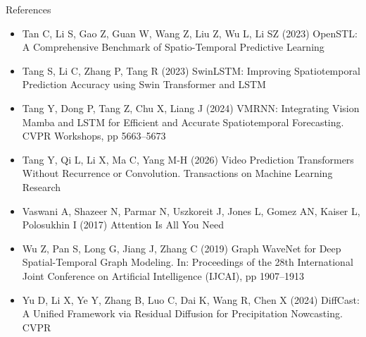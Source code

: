 \documentclass{beamer}
\begin{document}
\begin{frame}[allowframebreaks]{References}
\begin{itemize}
        \item[] Tan C, Li S, Gao Z, Guan W, Wang Z, Liu Z, Wu L, Li SZ (2023) OpenSTL: A Comprehensive Benchmark of Spatio-Temporal Predictive Learning
        \item[] Tang S, Li C, Zhang P, Tang R (2023) SwinLSTM: Improving Spatiotemporal Prediction Accuracy using Swin Transformer and LSTM
        \item[] Tang Y, Dong P, Tang Z, Chu X, Liang J (2024) VMRNN: Integrating Vision Mamba and LSTM for Efficient and Accurate Spatiotemporal Forecasting. CVPR Workshops, pp 5663--5673
        \item[] Tang Y, Qi L, Li X, Ma C, Yang M-H (2026) Video Prediction Transformers Without Recurrence or Convolution. Transactions on Machine Learning Research
        \item[] Vaswani A, Shazeer N, Parmar N, Uszkoreit J, Jones L, Gomez AN, Kaiser L, Polosukhin I (2017) Attention Is All You Need
        \item[] Wu Z, Pan S, Long G, Jiang J, Zhang C (2019) Graph WaveNet for Deep Spatial-Temporal Graph Modeling. In: Proceedings of the 28th International Joint Conference on Artificial Intelligence (IJCAI), pp 1907--1913
        \item[] Yu D, Li X, Ye Y, Zhang B, Luo C, Dai K, Wang R, Chen X (2024) DiffCast: A Unified Framework via Residual Diffusion for Precipitation Nowcasting. CVPR
    \end{itemize}
\end{frame}
\end{document}
